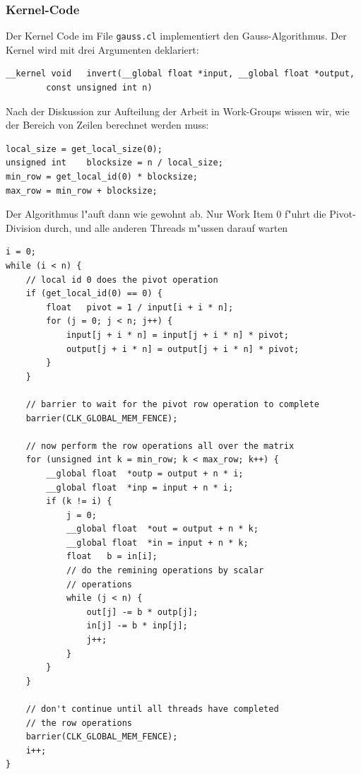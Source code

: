 \subsubsection{Kernel-Code}
Der Kernel Code im File \verb+gauss.cl+ implementiert den Gauss-Algorithmus.
Der Kernel wird mit drei Argumenten deklariert:
\begin{verbatim}
__kernel void   invert(__global float *input, __global float *output,
        const unsigned int n)
\end{verbatim}
Nach der Diskussion zur Aufteilung der Arbeit in Work-Groups wissen wir,
wie der Bereich von Zeilen berechnet werden muss:
\begin{verbatim}
local_size = get_local_size(0);
unsigned int    blocksize = n / local_size;
min_row = get_local_id(0) * blocksize;
max_row = min_row + blocksize;
\end{verbatim}
Der Algorithmus l"auft dann wie gewohnt ab.
Nur Work Item 0 f"uhrt die Pivot-Division durch, und alle anderen
Threads m"ussen darauf warten
\begin{verbatim}
i = 0;
while (i < n) {
    // local id 0 does the pivot operation
    if (get_local_id(0) == 0) {
        float   pivot = 1 / input[i + i * n];
        for (j = 0; j < n; j++) {
            input[j + i * n] = input[j + i * n] * pivot;
            output[j + i * n] = output[j + i * n] * pivot;
        }
    }

    // barrier to wait for the pivot row operation to complete
    barrier(CLK_GLOBAL_MEM_FENCE);

    // now perform the row operations all over the matrix
    for (unsigned int k = min_row; k < max_row; k++) {
        __global float  *outp = output + n * i;
        __global float  *inp = input + n * i;
        if (k != i) {
            j = 0; 
            __global float  *out = output + n * k;
            __global float  *in = input + n * k;
            float   b = in[i];
            // do the remining operations by scalar
            // operations
            while (j < n) {
                out[j] -= b * outp[j];
                in[j] -= b * inp[j];
                j++;
            }
        }
    }

    // don't continue until all threads have completed
    // the row operations
    barrier(CLK_GLOBAL_MEM_FENCE);
    i++;
}
\end{verbatim}


